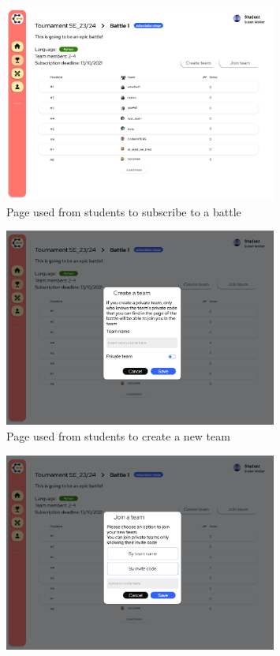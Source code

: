 \begin{enumerate}[label=\textbf{F\arabic*)}]
\begin{figure}[H]
        \centering
        \includegraphics[width=0.8\textwidth]{Mockups/11_student_battle_subscription.png}
        \caption{Page used from students to subscribe to a battle}
    \end{figure}
    \begin{figure}[H]
        \centering
        \includegraphics[width=0.8\textwidth]{Mockups/12_student_create_team.png}
        \caption{Page used from students to create a new team}
    \end{figure}
    \begin{figure}[H]
        \centering
        \includegraphics[width=0.8\textwidth]{Mockups/13_student_join_team.png}

\end{figure}
\end{enumerate}
